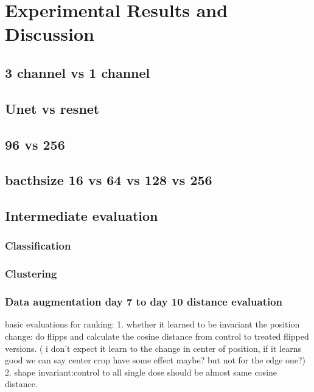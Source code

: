 \chapter{Experimental Results and Discussion} \label{chapter:experimental results and Discussion} 

\section{3 channel vs 1 channel}
\section{Unet vs resnet}

\section{96 vs 256}
\section{bacthsize 16 vs 64 vs 128 vs 256}



\section{Intermediate evaluation}
\subsection{Classification} \label{subsection:classification}

\subsection{Clustering} \label{subsection:kmeans}

\subsection{Data augmentation  day 7 to day 10 distance evaluation} \label{subsection:day7today10distance}
basic evaluations for ranking:
1.
whether it learned to be invariant the position change:
do flipps and calculate the cosine distance from control to treated flipped versions. ( i don't expect it learn to the change in center of position, 
if it learns good we can say center crop have some effect maybe? but not for the edge one?)
2. 
shape invariant:control to all single dose should be almost same cosine distance.

